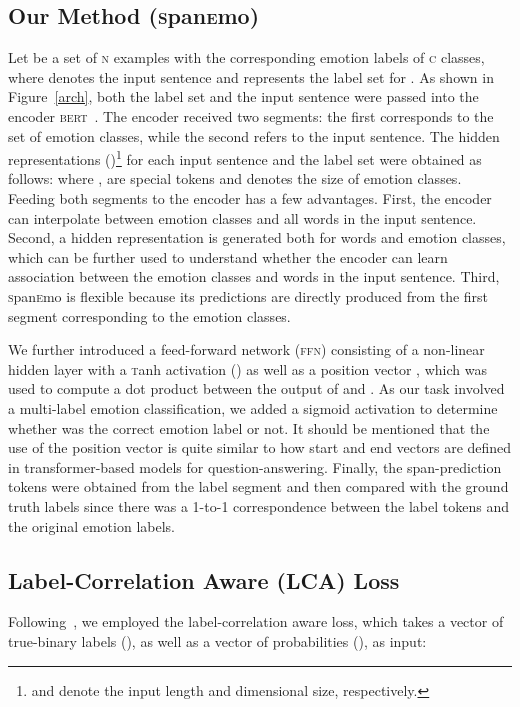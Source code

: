 \documentclass[11pt,a4paper]{article}
\begin{document}
\subsection{Our Method (\textsc{s}pan\textsc{e}mo)}
Let  be a set of \textsc{n} examples with the corresponding emotion labels of \textsc{c} classes, where  denotes the input sentence and  represents the label set for . As shown in Figure~\ref{arch}, both the label set and the input sentence were passed into the encoder \textsc{bert}~\cite{devlin2019bert}. The encoder received two segments: the first corresponds to the set of emotion classes, while the second refers to the input sentence. The hidden representations ()\footnote{ and  denote the input length and dimensional size, respectively.} for each input sentence and the label set were obtained as follows:
where ,  are special tokens and  denotes the size of emotion classes. Feeding both segments to the encoder has a few advantages. First, the encoder can interpolate between emotion classes and all words in the input sentence. Second, a hidden representation is generated both for words and emotion classes, which can be further used to understand whether the encoder can learn association between the emotion classes and words in the input sentence. Third, \textsc{s}pan\textsc{e}mo is flexible because its predictions are directly produced from the first segment corresponding to the emotion classes.

We further introduced a feed-forward network (\textsc{ffn}) consisting of a non-linear hidden layer with a \textsc{t}anh activation () as well as a position vector , which was used to compute a dot product between the output of  and . As our task involved a multi-label emotion classification, we added a sigmoid activation to determine whether  was the correct emotion label or not. It should be mentioned that the use of the position vector is quite similar to how start and end vectors are defined in transformer-based models for question-answering. Finally, the span-prediction tokens were obtained from the label segment and then compared with the ground truth labels since there was a 1-to-1 correspondence between the label tokens and the original emotion labels.


\subsection{Label-Correlation Aware (LCA) Loss}
Following~, we employed the label-correlation aware loss, which takes a vector of true-binary labels (), as well as a vector of probabilities (), as input:
\end{document}
